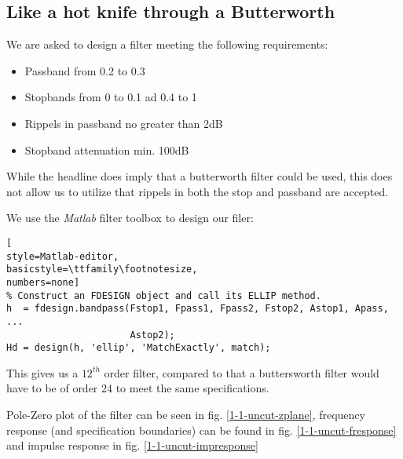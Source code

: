 \subsection{Like a hot knife through a Butterworth}

We are asked to design a filter meeting the following requirements:
\begin{itemize}
  \item Passband from 0.2 to 0.3
  \item Stopbands from 0 to 0.1 ad 0.4 to 1
  \item Rippels in passband no greater than 2dB
  \item Stopband attenuation min. 100dB
\end{itemize}

While the headline does imply that a butterworth filter could be used, this
does not allow us to utilize that rippels in both the stop and passband are
accepted.

We use the \emph{Matlab} filter toolbox to design our filer:
\begin{lstlisting}[
style=Matlab-editor,
basicstyle=\ttfamily\footnotesize,
numbers=none]
% Construct an FDESIGN object and call its ELLIP method.
h  = fdesign.bandpass(Fstop1, Fpass1, Fpass2, Fstop2, Astop1, Apass, ...
                      Astop2);
Hd = design(h, 'ellip', 'MatchExactly', match);
\end{lstlisting}
This gives us a $12^{th}$ order filter, compared to that a buttersworth filter
would have to be of order $24$ to meet the same specifications.

Pole-Zero plot of the filter can be seen in fig. \ref{1-1-uncut-zplane},
frequency response (and specification boundaries) can be found in fig.
\ref{1-1-uncut-fresponse} and impulse response in fig.
\ref{1-1-uncut-impresponse}



